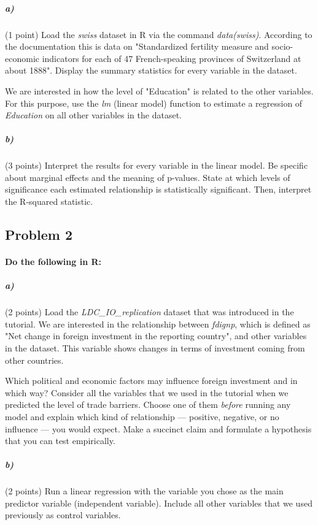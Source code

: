 \documentclass[12pt,letter]{article}
\begin{document}
\subparagraph{a)} (1 point) Load the \textit{swiss} dataset in R via the command \textit{data(swiss)}. According to the documentation this is data on "Standardized fertility measure and socio-economic indicators for each of 47 French-speaking provinces of Switzerland at about 1888". Display the summary statistics for every variable in the dataset.

We are interested in how the level of "Education" is related to the other variables. For this purpose, use the \textit{lm} (linear model) function to estimate a regression of \textit{Education} on all other variables in the dataset.

\subparagraph{b)} (3 points) Interpret the results for every variable in the linear model. Be specific about marginal effects and the meaning of p-values. State at which levels of significance each estimated relationship is statistically significant. Then, interpret the R-squared statistic.



\subsection*{Problem 2}

\paragraph{Do the following in R:}

\subparagraph{a)} (2 points) Load the \textit{LDC\_IO\_replication} dataset that was introduced in the tutorial. We are interested in the relationship between \textit{fdignp}, which is defined as "Net change in foreign investment in the reporting country", and other variables in the dataset. This variable shows changes in terms of investment coming from other countries.

Which political and economic factors may influence foreign investment and in which way? Consider all the variables that we used in the tutorial when we predicted the level of trade barriers. Choose one of them \textit{before} running any model and explain which kind of relationship --- positive, negative, or no influence --- you would expect. Make a succinct claim and formulate a hypothesis that you can test empirically.

\subparagraph{b)} (2 points) Run a linear regression with the variable you chose as the main predictor variable (independent variable). Include all other variables that we used previously as control variables.
\end{document}
